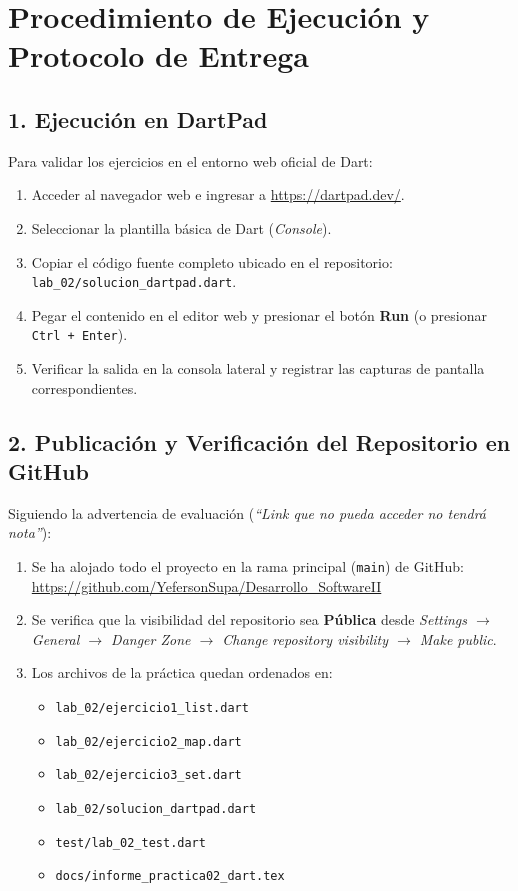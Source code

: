 \documentclass[12pt,a4paper]{article}
\begin{document}
\section{Procedimiento de Ejecución y Protocolo de Entrega}

\subsection{1. Ejecución en DartPad}
Para validar los ejercicios en el entorno web oficial de Dart:
\begin{enumerate}
    \item Acceder al navegador web e ingresar a \url{https://dartpad.dev/}.
    \item Seleccionar la plantilla básica de Dart (\textit{Console}).
    \item Copiar el código fuente completo ubicado en el repositorio: \texttt{lab\_02/solucion\_dartpad.dart}.
    \item Pegar el contenido en el editor web y presionar el botón \textbf{Run} (o presionar \texttt{Ctrl + Enter}).
    \item Verificar la salida en la consola lateral y registrar las capturas de pantalla correspondientes.
\end{enumerate}

\subsection{2. Publicación y Verificación del Repositorio en GitHub}
Siguiendo la advertencia de evaluación (\textit{``Link que no pueda acceder no tendrá nota''}):
\begin{enumerate}
    \item Se ha alojado todo el proyecto en la rama principal (\texttt{main}) de GitHub: \\
    \url{https://github.com/YefersonSupa/Desarrollo_SoftwareII}
    \item Se verifica que la visibilidad del repositorio sea \textbf{Pública} desde \textit{Settings $\rightarrow$ General $\rightarrow$ Danger Zone $\rightarrow$ Change repository visibility $\rightarrow$ Make public}.
    \item Los archivos de la práctica quedan ordenados en:
    \begin{itemize}
        \item \texttt{lab\_02/ejercicio1\_list.dart}
        \item \texttt{lab\_02/ejercicio2\_map.dart}
        \item \texttt{lab\_02/ejercicio3\_set.dart}
        \item \texttt{lab\_02/solucion\_dartpad.dart}
        \item \texttt{test/lab\_02\_test.dart}
        \item \texttt{docs/informe\_practica02\_dart.tex}
    \end{itemize}
\end{enumerate}
\end{document}
